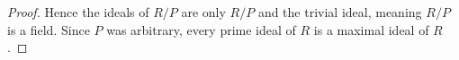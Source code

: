 \documentclass[11pt]{article}
\begin{document}
\begin{enumerate}
\begin{proof}
      Hence the ideals of $R/P$ are only $R/P$ and the trivial ideal, meaning $R/P$ is a field. Since $P$ was arbitrary, every prime ideal of $R$ is a maximal ideal of $R$.
    \end{proof}
\end{enumerate}
\end{document}
